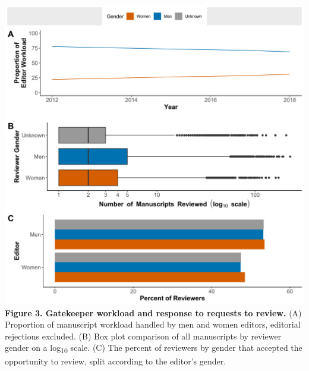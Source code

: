 \documentclass[11pt,]{article}
\begin{document}
\includegraphics{Figure_3.png} \textbf{Figure 3. Gatekeeper workload and
response to requests to review.} (A) Proportion of manuscript workload
handled by men and women editors, editorial rejections excluded. (B) Box
plot comparison of all manuscripts by reviewer gender on a
log\textsubscript{10} scale. (C) The percent of reviewers by gender that
accepted the opportunity to review, split according to the editor's
gender.

\newpage
\end{document}

